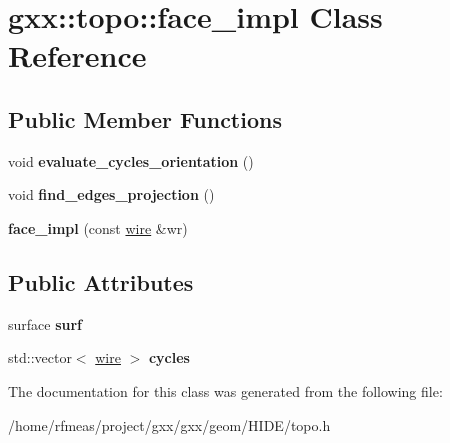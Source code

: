 \hypertarget{classgxx_1_1topo_1_1face__impl}{}\section{gxx\+:\+:topo\+:\+:face\+\_\+impl Class Reference}
\label{classgxx_1_1topo_1_1face__impl}
\subsection*{Public Member Functions}
\begin{DoxyCompactItemize}
\item 
void {\bfseries evaluate\+\_\+cycles\+\_\+orientation} ()\hypertarget{classgxx_1_1topo_1_1face__impl_aaa0ec554aef1a65eee290306a6b1e67c}{}\label{classgxx_1_1topo_1_1face__impl_aaa0ec554aef1a65eee290306a6b1e67c}

\item 
void {\bfseries find\+\_\+edges\+\_\+projection} ()\hypertarget{classgxx_1_1topo_1_1face__impl_a5d426ce5b2cfd4778c975f32c8a8e399}{}\label{classgxx_1_1topo_1_1face__impl_a5d426ce5b2cfd4778c975f32c8a8e399}

\item 
{\bfseries face\+\_\+impl} (const \hyperlink{classgxx_1_1topo_1_1wire}{wire} \&wr)\hypertarget{classgxx_1_1topo_1_1face__impl_ae10de43b37e1989ea2c9ea7266727db8}{}\label{classgxx_1_1topo_1_1face__impl_ae10de43b37e1989ea2c9ea7266727db8}

\end{DoxyCompactItemize}
\subsection*{Public Attributes}
\begin{DoxyCompactItemize}
\item 
surface {\bfseries surf}\hypertarget{classgxx_1_1topo_1_1face__impl_abc4dcff451b33909689a69dde98ae4e4}{}\label{classgxx_1_1topo_1_1face__impl_abc4dcff451b33909689a69dde98ae4e4}

\item 
std\+::vector$<$ \hyperlink{classgxx_1_1topo_1_1wire}{wire} $>$ {\bfseries cycles}\hypertarget{classgxx_1_1topo_1_1face__impl_a21ddfdff696eb39e98a33749fb05a5f7}{}\label{classgxx_1_1topo_1_1face__impl_a21ddfdff696eb39e98a33749fb05a5f7}

\end{DoxyCompactItemize}


The documentation for this class was generated from the following file\+:\begin{DoxyCompactItemize}
\item 
/home/rfmeas/project/gxx/gxx/geom/\+H\+I\+D\+E/topo.\+h\end{DoxyCompactItemize}
